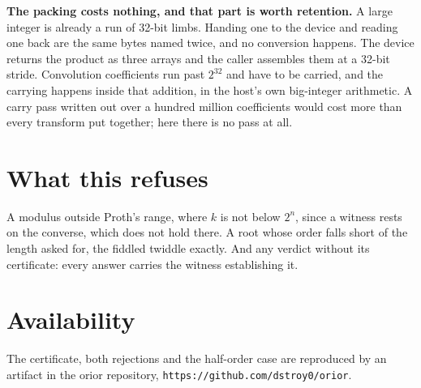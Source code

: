 \textbf{The packing costs nothing, and that part is worth retention.} A large integer is already a run of 32-bit limbs. Handing one to the device and reading one back are the same bytes named twice, and no conversion happens. The device returns the product as three arrays and the caller assembles them at a 32-bit stride. Convolution coefficients run past \(2^{32}\) and have to be carried, and the carrying happens inside that addition, in the host's own big-integer arithmetic. A carry pass written out over a hundred million coefficients would cost more than every transform put together; here there is no pass at all.

\section{What this refuses}

A modulus outside Proth's range, where \(k\) is not below \(2^n\), since a witness rests on the converse, which does not hold there. A root whose order falls short of the length asked for, the fiddled twiddle exactly. And any verdict without its certificate: every answer carries the witness establishing it.

\section{Availability}

The certificate, both rejections and the half-order case are reproduced by an artifact in the orior repository, \texttt{https://github.com/dstroy0/orior}.
